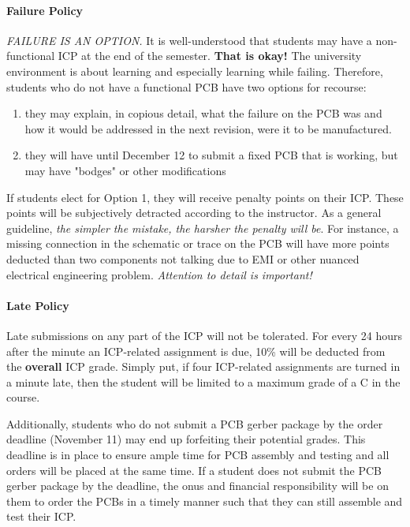     \paragraph*{Failure Policy} \emph{FAILURE IS AN OPTION.} It is well-understood that students may have a non-functional ICP at the end of the semester. \textbf{That is okay!}
    The university environment is about learning and especially learning while failing.
    Therefore, students who do not have a functional PCB have two options for recourse:
    \begin{enumerate}
        \item they may explain, in copious detail, what the failure on the PCB was and how it would be addressed in the next revision, were it to be manufactured. 
        \item they will have until December 12 to submit a fixed PCB that is working, but may have "bodges" or other modifications
    \end{enumerate}
    If students elect for Option 1, they will receive penalty points on their ICP. These points will be subjectively detracted according to the instructor. As a general guideline, \emph{the simpler the mistake, the harsher the penalty will be}. 
    For instance, a missing connection in the schematic or trace on the PCB will have more points deducted than two components not talking due to EMI or other nuanced electrical engineering problem.
    \emph{Attention to detail is important!}

    \paragraph*{Late Policy} Late submissions on any part of the ICP will not be tolerated. For every 24 hours after the minute an ICP-related assignment is due, 10\% will be deducted from the \textbf{overall} ICP grade.
    Simply put, if four ICP-related assignments are turned in a minute late, then the student will be limited to a maximum grade of a C in the course.
    
    Additionally, students who do not submit a PCB gerber package by the order deadline (November 11) may end up forfeiting their potential grades.
    This deadline is in place to ensure ample time for PCB assembly and testing and all orders will be placed at the same time.
    If a student does not submit the PCB gerber package by the deadline, the onus and financial responsibility will be on them to order the PCBs in a timely manner such that they can still assemble and test their ICP.

